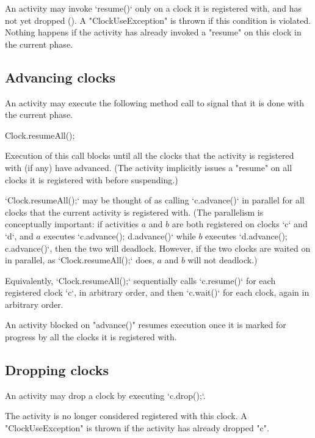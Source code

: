 An activity may invoke \xcd`resume()` only on a clock it is registered with,
and has not yet dropped (). A
\xcd"ClockUseException" is thrown if this
condition is violated. Nothing happens if the activity has already invoked a
\xcd"resume" on this clock in the current phase.

\subsection{Advancing clocks}\label{sec:clock:next}
An activity may execute the following method call to signal that it is done
with the current phase.
\begin{xten}
Clock.resumeAll();
\end{xten}

\noindent 
Execution of this call blocks until all the clocks that the
activity is registered with (if any) have advanced. (The activity
implicitly issues a \xcd"resume" on all clocks it is registered
with before suspending.)

\xcd`Clock.resumeAll();` may be thought of as calling \xcd`c.advance()` in parallel for all
clocks that the current activity is registered with.  (The parallelism is
conceptually important: if activities {$a$} and {$b$} are both
registered on clocks \xcd`c` and \xcd`d`, and {$a$} executes
\xcd`c.advance(); d.advance()` while {$b$} executes \xcd`d.advance(); c.advance()`,
then the two will deadlock.  However, if the two clocks are waited on in
parallel, as \xcd`Clock.resumeAll();` does, {$a$} and {$b$} will not deadlock.)

Equivalently, \xcd`Clock.resumeAll();` sequentially calls \xcd`c.resume()` for each
registered clock \xcd`c`, in arbitrary order, and then \xcd`c.wait()` for each
clock, again in arbitrary order.  



An activity blocked on \xcd"advance()" resumes execution once
it is marked for progress by all the clocks it is registered with.

\subsection{Dropping clocks}\label{sec:clock:drop}
An activity may drop a clock by executing \xcd`c.drop();`.



\noindent{} The activity is no longer considered registered with this
clock.  A \xcd"ClockUseException" is thrown if the activity has
already dropped \xcd"c".

